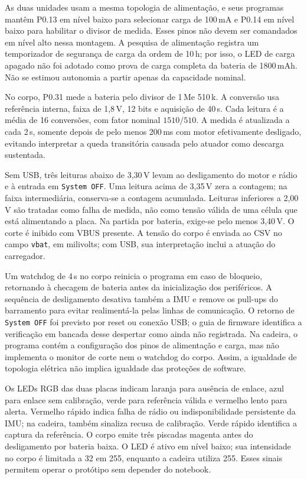 As duas unidades usam a mesma topologia de alimentação, e seus
programas mantêm P0.13 em nível baixo para selecionar carga de
100\,mA e P0.14 em nível baixo para habilitar o divisor de medida.
Esses pinos não devem ser comandados em nível alto nessa montagem.
A pesquisa de alimentação registra um temporizador de segurança de
carga da ordem de 10\,h; por isso, o LED de carga apagado não foi
adotado como prova de carga completa da bateria de 1800\,mAh.
Não se estimou autonomia a partir apenas da capacidade nominal.

No corpo, P0.31 mede a bateria pelo divisor de 1\,M\ohm e
510\,k\ohm. A conversão usa referência interna, faixa de
1{,}8\,V, 12 bits e aquisição de 40\,\textmu s. Cada leitura é a
média de 16 conversões, com fator nominal $1510/510$. A medida é
atualizada a cada 2\,s, somente depois de pelo menos 200\,ms
com motor efetivamente desligado, evitando interpretar a queda
transitória causada pelo atuador como descarga sustentada.

Sem USB, três leituras abaixo de 3{,}30\,V levam ao desligamento
do motor e rádio e à entrada em \texttt{System OFF}. Uma leitura acima
de 3{,}35\,V zera a contagem; na faixa intermediária, conserva-se
a contagem acumulada. Leituras inferiores a 2{,}00\,V são tratadas
como falha de medida, não como tensão válida de uma célula que está
alimentando a placa. Na partida por bateria, exige-se pelo menos
3{,}40\,V. O corte é inibido com VBUS presente. A tensão do corpo
é enviada ao CSV no campo \texttt{vbat}, em milivolts; com USB,
sua interpretação inclui a atuação do carregador.

Um watchdog de 4\,s no corpo reinicia o programa em caso de
bloqueio, retornando à checagem de bateria antes da inicialização dos
periféricos. A sequência de desligamento desativa também a IMU e
remove os pull-ups do barramento para evitar realimentá-la pelas
linhas de comunicação. O retorno de \texttt{System OFF} foi previsto
por reset ou conexão USB; o guia de firmware identifica a verificação
em bancada desse despertar como ainda não registrada. Na cadeira,
o programa contém a configuração dos pinos de alimentação e carga,
mas não implementa o monitor de corte nem o watchdog do corpo.
Assim, a igualdade de topologia elétrica não implica igualdade das
proteções de software.

Os LEDs RGB das duas placas indicam laranja para ausência de enlace,
azul para enlace sem calibração, verde para referência válida e
vermelho lento para alerta. Vermelho rápido indica falha de rádio ou
indisponibilidade persistente da IMU; na cadeira, também sinaliza
recusa de calibração. Verde rápido identifica a captura da referência.
O corpo emite três piscadas magenta antes do desligamento por bateria
baixa. O LED é ativo em nível baixo; sua intensidade no corpo é
limitada a 32 em 255, enquanto a cadeira utiliza 255. Esses sinais
permitem operar o protótipo sem depender do notebook.

